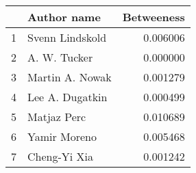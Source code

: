 \begin{tabular}{llr}
\toprule
{} &      Author name &  Betweeness \\
\midrule
1 &  Svenn Lindskold &    0.006006 \\
2 &     A. W. Tucker &    0.000000 \\
3 &  Martin A. Nowak &    0.001279 \\
4 &  Lee A. Dugatkin &    0.000499 \\
5 &      Matjaz Perc &    0.010689 \\
6 &     Yamir Moreno &    0.005468 \\
7 &     Cheng-Yi Xia &    0.001242 \\
\bottomrule
\end{tabular}
